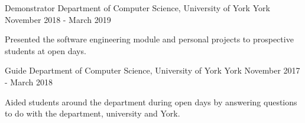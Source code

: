 
\begin{cventries}
  \cventry
    {Demonstrator} %
    {Department of Computer Science, University of York} %
    {York} %
    {November 2018 - March 2019} %
    {
      \begin{cvitems} %
        \item {Presented the software engineering module and personal projects to prospective students at open days.}
      \end{cvitems}
    }

  \cventry
    {Guide} %
    {Department of Computer Science, University of York} %
    {York} %
    {November 2017 - March 2018} %
    {
      \begin{cvitems} %
        \item {Aided students around the department during open days by answering questions to do with the department, university and York.}
      \end{cvitems}
    }

\end{cventries}
